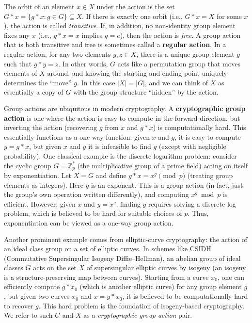 \documentclass[12pt]{report}
\begin{document}
The orbit of an element $x \in X$ under the action is the set $G * x = \{g*x : g \in G\} \subseteq X$. If there is exactly one orbit (i.e., $G * x = X$ for some $x$), the action is called \emph{transitive}. If, in addition, no non-identity group element fixes any $x$ (i.e., $g * x = x$ implies $g = e$), then the action is \emph{free}. A group action that is both transitive and free is sometimes called a \textbf{regular action}. In a regular action, for any two elements $y, z \in X$, there is a unique group element $g$ such that $g * y = z$. In other words, $G$ acts like a permutation group that moves elements of $X$ around, and knowing the starting and ending point uniquely determines the “move” $g$. In this case $|X| = |G|$, and we can think of $X$ as essentially a copy of $G$ with the group structure “hidden” by the action.

Group actions are ubiquitous in modern cryptography. A \textbf{cryptographic group action} is one where the action is easy to compute in the forward direction, but inverting the action (recovering $g$ from $x$ and $g*x$) is computationally hard. This essentially functions as a one-way function: given $x$ and $g$, it is easy to compute $y = g*x$, but given $x$ and $y$ it is infeasible to find $g$ (except with negligible probability). One classical example is the discrete logarithm problem: consider the cyclic group $G = \mathbb{Z}_p^*$ (the multiplicative group of a prime field) acting on itself by exponentiation. Let $X = G$ and define $g * x = x^g \pmod p$ (treating group elements as integers). Here $g$ is an exponent. This is a group action (in fact, just the group’s own operation written differently), and computing $x^g \bmod p$ is efficient. However, given $x$ and $y = x^g$, finding $g$ requires solving a discrete log problem, which is believed to be hard for suitable choices of $p$. Thus, exponentiation can be viewed as a one-way group action.

Another prominent example comes from elliptic-curve cryptography: the action of an ideal class group on a set of elliptic curves. In schemes like CSIDH (Commutative Supersingular Isogeny Diffie–Hellman), an abelian group of ideal classes $G$ acts on the set $X$ of supersingular elliptic curves by isogeny (an isogeny is a structure-preserving map between curves). Starting from a curve $x_0$, one can efficiently compute $g * x_0$ (which is another elliptic curve) for any group element $g$, but given two curves $x_0$ and $x = g * x_0$, it is believed to be computationally hard to recover $g$. This hard problem is the foundation of isogeny-based cryptography. We refer to such $G$ and $X$ as a \emph{cryptographic group action} pair.
\end{document}
